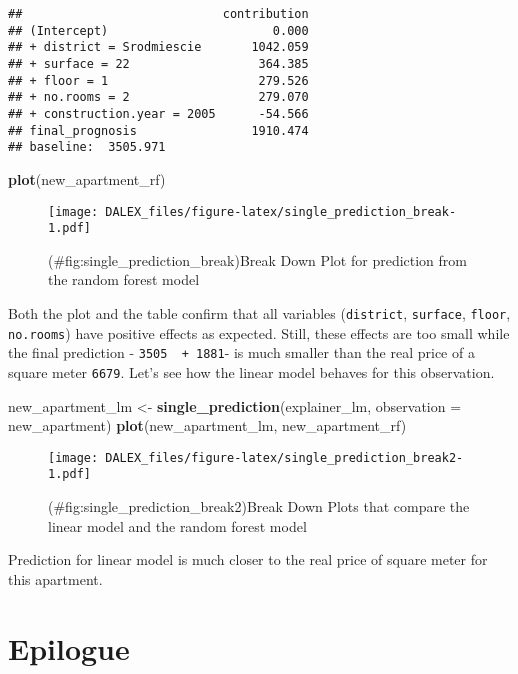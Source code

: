 \documentclass[]{book}
\newenvironment{Shaded}{\begin{snugshade}}{\end{snugshade}}
\newcommand{\DataTypeTok}[1]{\textcolor[rgb]{0.13,0.29,0.53}{#1}}
\newcommand{\KeywordTok}[1]{\textcolor[rgb]{0.13,0.29,0.53}{\textbf{#1}}}
\newcommand{\NormalTok}[1]{#1}
\newcommand{\StringTok}[1]{\textcolor[rgb]{0.31,0.60,0.02}{#1}}
\theoremstyle{definition}
\theoremstyle{definition}
\theoremstyle{definition}
\theoremstyle{remark}
\begin{document}
\begin{verbatim}
##                            contribution
## (Intercept)                       0.000
## + district = Srodmiescie       1042.059
## + surface = 22                  364.385
## + floor = 1                     279.526
## + no.rooms = 2                  279.070
## + construction.year = 2005      -54.566
## final_prognosis                1910.474
## baseline:  3505.971
\end{verbatim}

\begin{Shaded}
\begin{Highlighting}[]
\KeywordTok{plot}\NormalTok{(new_apartment_rf)}
\end{Highlighting}
\end{Shaded}

\begin{figure}
\centering
\texttt{[image: DALEX\_files/figure-latex/single\_prediction\_break-1.pdf]}
\caption{(\#fig:single\_prediction\_break)Break Down Plot for prediction
from the random forest model}
\end{figure}

Both the plot and the table confirm that all variables
(\texttt{district}, \texttt{surface}, \texttt{floor}, \texttt{no.rooms})
have positive effects as expected. Still, these effects are too small
while the final prediction - \texttt{3505\ \ +\ 1881}- is much smaller
than the real price of a square meter \texttt{6679}. Let's see how the
linear model behaves for this observation.

\begin{Shaded}
\begin{Highlighting}[]
\NormalTok{new_apartment_lm <-}\StringTok{ }\KeywordTok{single_prediction}\NormalTok{(explainer_lm, }\DataTypeTok{observation =}\NormalTok{ new_apartment)}
\KeywordTok{plot}\NormalTok{(new_apartment_lm, new_apartment_rf)}
\end{Highlighting}
\end{Shaded}

\begin{figure}
\centering
\texttt{[image: DALEX\_files/figure-latex/single\_prediction\_break2-1.pdf]}
\caption{(\#fig:single\_prediction\_break2)Break Down Plots that compare
the linear model and the random forest model}
\end{figure}

Prediction for linear model is much closer to the real price of square
meter for this apartment.

\hypertarget{epilogue}{%
\chapter{Epilogue}\label{epilogue}}
\end{document}
